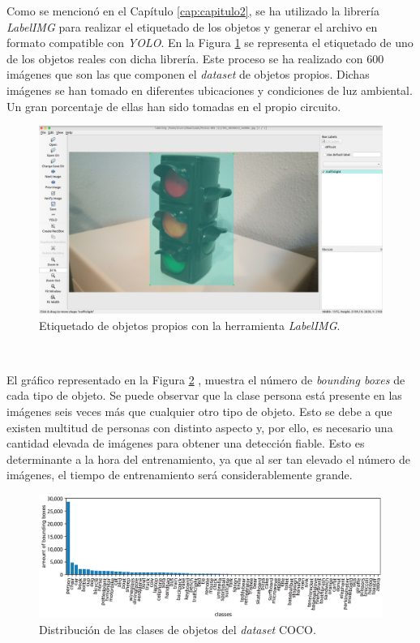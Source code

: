 Como se mencionó en el Capítulo \ref{cap:capitulo2}, se ha utilizado la librería \textit{LabelIMG} para realizar el etiquetado de los objetos y generar el archivo en formato compatible con \textit{YOLO}. En la Figura \ref{fig:customlabelimg} se representa el etiquetado de uno de los objetos reales con dicha librería. Este proceso se ha realizado con 600 imágenes que son las que componen el \textit{dataset} de objetos propios. Dichas imágenes se han tomado en diferentes ubicaciones y condiciones de luz ambiental. Un gran porcentaje de ellas han sido tomadas en el propio circuito.\\
\begin{figure} [h!]
	\begin{center}
		\includegraphics[width=14cm]{figs/customlabelimg}
	\end{center}
	\caption{Etiquetado de objetos propios con la herramienta \textit{LabelIMG}.}
	\label{fig:customlabelimg}
\end{figure}\

El gráfico representado en la Figura \ref{fig:graphcoco} \cite{graphcoco}, muestra el número de \textit{bounding boxes} de cada tipo de objeto. Se puede observar que la clase persona está presente en las imágenes seis veces más que cualquier otro tipo de objeto. Esto se debe a que existen multitud de personas con distinto aspecto y, por ello, es necesario una cantidad elevada de imágenes para obtener una detección fiable. Esto es determinante a la hora del entrenamiento, ya que al ser tan elevado el número de imágenes, el tiempo de entrenamiento será considerablemente grande.\\

\begin{figure} [h!]
	\begin{center}
		\includegraphics[width=16cm]{figs/graphcoco}
	\end{center}
	\caption{Distribución de las clases de objetos del \textit{dataset} COCO.}
	\label{fig:graphcoco}
\end{figure}\

